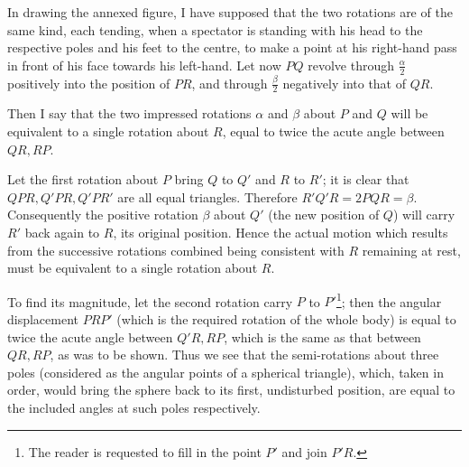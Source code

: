 \documentclass[11pt]{article}
\newcommand{\sourcepage}[1]{\marginpar{\scriptsize p.~#1}}
\begin{document}
{{\begin{center}
\end{center}

In drawing the annexed figure, I have supposed that the two rotations are of the same kind, each tending, when a spectator is standing with his head to the respective poles and his feet to the centre, to make a point at his right-hand pass in front of his face towards his left-hand. Let now $PQ$ revolve through $\frac{\alpha}{2}$ positively into the position of $PR$, and through $\frac{\beta}{2}$ negatively into that of $QR$.

Then I say that the two impressed rotations $\alpha$ and $\beta$ about $P$ and $Q$ will be equivalent to a single rotation about $R$, equal to twice the acute angle between $QR,RP$.

Let the first rotation about $P$ bring $Q$ to $Q'$ and $R$ to $R'$; it is clear that $QPR,Q'PR,Q'PR'$ are all equal triangles. Therefore $R'Q'R=2PQR=\beta$. Consequently the positive rotation $\beta$ about $Q'$ (the new position of $Q$) will carry $R'$ back again to $R$, its original position. Hence the actual motion which results from the successive rotations combined being consistent with $R$ remaining at rest, must be equivalent to a single rotation about $R$.

To find its magnitude, let the second rotation carry $P$ to $P'$\footnote{The reader is requested to fill in the point $P'$ and join $P'R$.}; then the angular displacement $PRP'$ (which is the required rotation of the whole \sourcepage{159} body) is equal to twice the acute angle between $Q'R,RP$, which is the same as that between $QR,RP$, as was to be shown. Thus we see that the semi-rotations about three poles (considered as the angular points of a spherical triangle), which, taken in order, would bring the sphere back to its first, undisturbed position, are equal to the included angles at such poles respectively.

}}
\end{document}
